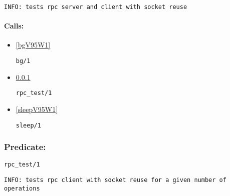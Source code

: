 {\small \begin{verbatim}
INFO: tests rpc server and client with socket reuse

\end{verbatim}}
\paragraph{Calls:} 
\begin{itemize}
\item \ref{bgV95W1} 
\begin{verbatim}
bg/1
\end{verbatim}

\item \ref{rpcV95WtestV95W1} 
\begin{verbatim}
rpc_test/1
\end{verbatim}

\item \ref{sleepV95W1} 
\begin{verbatim}
sleep/1
\end{verbatim}

\end{itemize}

\subsubsection{Predicate:} \label{rpcV95WtestV95W1}

\begin{verbatim}
rpc_test/1
\end{verbatim}

{\small \begin{verbatim}
INFO: tests rpc client with socket reuse for a given number of operations

\end{verbatim}}
